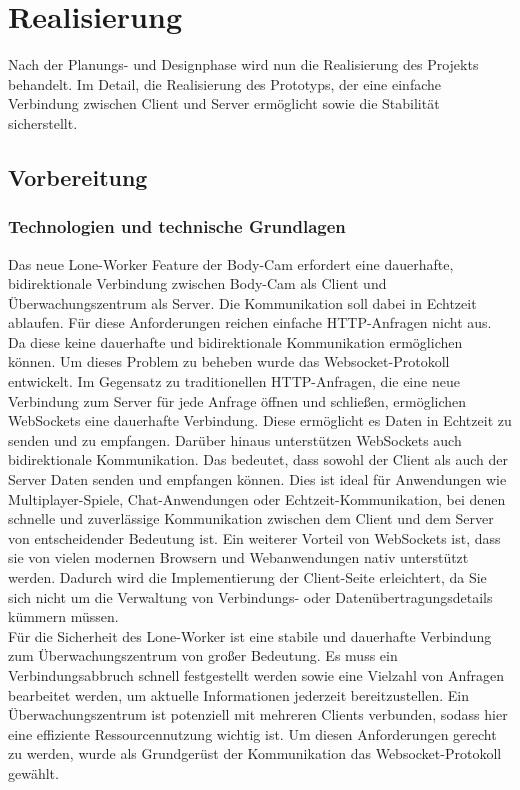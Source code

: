 \documentclass[thesis.tex]{subfiles}
\begin{document}
\chapter{Realisierung}\label{chap:realisierung}

Nach der Planungs- und Designphase wird nun die Realisierung des Projekts behandelt. Im Detail, die Realisierung des Prototyps, der eine einfache Verbindung zwischen Client und Server ermöglicht sowie die Stabilität sicherstellt.

\section{Vorbereitung}
\subsection{Technologien und technische Grundlagen}\label{chap:technologien}

Das neue Lone-Worker Feature der Body-Cam erfordert eine dauerhafte, bidirektionale Verbindung zwischen Body-Cam als Client und Überwachungszentrum als Server.
Die Kommunikation soll dabei in Echtzeit ablaufen.
Für diese Anforderungen reichen einfache HTTP-Anfragen nicht aus.
Da diese keine dauerhafte und bidirektionale Kommunikation ermöglichen können.
Um dieses Problem zu beheben wurde das Websocket-Protokoll entwickelt.
Im Gegensatz zu traditionellen HTTP-Anfragen, die eine neue Verbindung zum Server für jede Anfrage öffnen und schließen, ermöglichen WebSockets eine dauerhafte Verbindung.
Diese ermöglicht es Daten in Echtzeit zu senden und zu empfangen.
Darüber hinaus unterstützen WebSockets auch bidirektionale Kommunikation.
Das bedeutet, dass sowohl der Client als auch der Server Daten senden und empfangen können.
Dies ist ideal für Anwendungen wie Multiplayer-Spiele, Chat-Anwendungen oder Echtzeit-Kommunikation, bei denen schnelle und zuverlässige Kommunikation zwischen dem Client und dem Server von entscheidender Bedeutung ist.
Ein weiterer Vorteil von WebSockets ist, dass sie von vielen modernen Browsern und Webanwendungen nativ unterstützt werden.
Dadurch wird die Implementierung der Client-Seite erleichtert, da Sie sich nicht um die Verwaltung von Verbindungs- oder Datenübertragungsdetails kümmern müssen. \cite[vgl. S.4f]{WebsocketProtokoll}
\\

Für die Sicherheit des Lone-Worker ist eine stabile und dauerhafte Verbindung zum Überwachungszentrum von großer Bedeutung.
Es muss ein Verbindungsabbruch schnell festgestellt werden sowie eine Vielzahl von Anfragen bearbeitet werden, um aktuelle Informationen jederzeit bereitzustellen.
Ein Überwachungszentrum ist potenziell mit mehreren Clients verbunden, sodass hier eine effiziente Ressourcennutzung wichtig ist.
Um diesen Anforderungen gerecht zu werden, wurde als Grundgerüst der Kommunikation das Websocket-Protokoll gewählt.
\\
\end{document}
